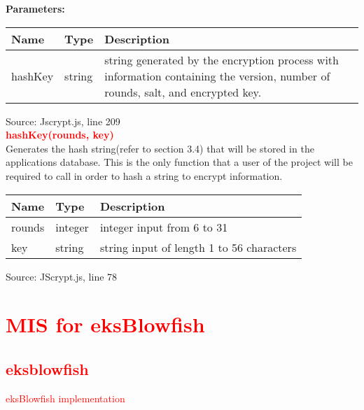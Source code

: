 \documentclass[12pt]{article}
\begin{document}
\noindent\textbf{Parameters:}
\begin{table}[H]
\centering
\label{tab:table2}
      \begin{tabular}{ | p{4cm} | p{4cm} | p{9cm} | }
        \hline
            \textbf{Name} & \textbf{Type} & \textbf{Description} \\
        \hline
          hashKey & string & string generated by the encryption process with information containing the version, number of rounds, salt, and encrypted key.  \\
       \hline
      \end{tabular}
  \end{table}
Source: Jscrypt.js, line 209 \\

\noindent\textbf{\textcolor{red}{hashKey(rounds, key)}} \\

\noindent Generates the hash string(refer to section 3.4) that will be stored in the applications database. This is the only function that a user of the project will be required to call in order to hash a string to encrypt information.

\begin{table}[H]
\centering
\label{tab:table5}
      \begin{tabular}{ | p{4cm} | p{4cm} | p{9cm} | }
        \hline
            \textbf{Name} & \textbf{Type} & \textbf{Description} \\
        \hline
          rounds & integer & integer input from 6 to 31  \\
        \hline
          key & string & string input of length 1 to 56 characters \\
       \hline
      \end{tabular}
  \end{table}

  Source: JScrypt.js, line 78\\


\section{\textcolor{red}{MIS for eksBlowfish}}

\subsection{\textcolor{red}{eksblowfish}}

\noindent\textcolor{red}{eksBlowfish implementation}
\end{document}
